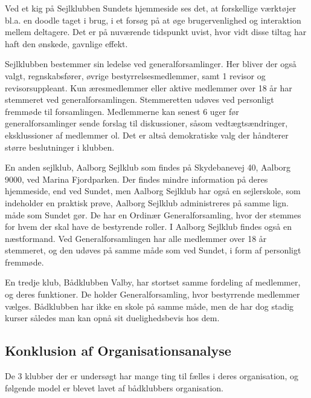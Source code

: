Ved et kig på Sejlklubben Sundets hjemmeside \citep{SundetUdlaan} ses det, at forskellige værktøjer bl.a. en doodle
taget i brug, i et forsøg på at øge brugervenlighed og interaktion mellem deltagere. Det er på nuværende tidspunkt
uvist, hvor vidt disse tiltag har haft den ønskede, gavnlige effekt.

Sejlklubben bestemmer sin ledelse ved generalforsamlinger. Her bliver der også valgt, regnskabsfører, øvrige
bestyrrelsesmedlemmer, samt 1 revisor og revisorsuppleant. Kun æresmedlemmer eller aktive medlemmer over 18 år har
stemmeret ved generalforsamlingen. Stemmeretten udøves ved personligt fremmøde til forsamlingen. Medlemmerne kan senest
6 uger før generalforsamlinger sende forslag til diskussioner, såsom vedtægtsændringer, eksklussioner af medlemmer ol.
Det er altså demokratiske valg der håndterer større beslutninger i klubben.

En anden sejlklub, Aalborg Sejlklub som findes på Skydebanevej 40, Aalborg 9000, ved Marina Fjordparken. Der findes
mindre information på deres hjemmeside, end ved Sundet, men Aalborg Sejlklub har også en sejlerskole, som indeholder en
praktisk prøve,  Aalborg Sejlklub administreres på samme lign. måde som Sundet gør. De har en
Ordinær Generalforsamling, hvor der stemmes for hvem der skal have de bestyrende roller. I Aalborg Sejlklub findes også en næstformand. Ved Generalforsamlingen har alle medlemmer over 18
år stemmeret, og den udøves på samme måde som ved Sundet, i form af personligt fremmøde.\citep{AalborgSejlklub}

En tredje klub, Bådklubben Valby, har stortset samme fordeling af medlemmer, og deres funktioner. De holder Generalforsamling, hvor bestyrrende medlemmer vælges. Bådklubben har ikke en skole på samme måde, men de har dog stadig kurser således man kan opnå sit duelighedsbevis hos dem.\citep{BaadklubbenValby}


\subsection{Konklusion af Organisationsanalyse}

De 3 klubber der er undersøgt har mange ting til fælles i deres organisation, og følgende model er blevet lavet af bådklubbers organisation. 


